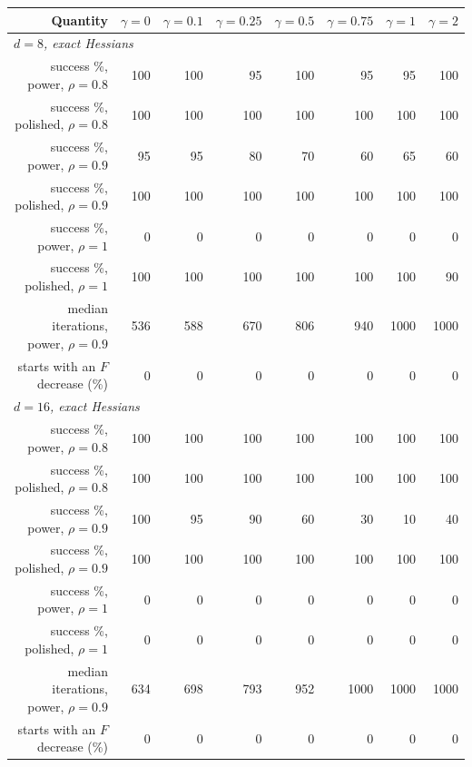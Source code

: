 \begin{tabular}{r rrrrrrr}
\toprule
Quantity & $\gamma=0$ & $\gamma=0.1$ & $\gamma=0.25$ & $\gamma=0.5$ & $\gamma=0.75$ & $\gamma=1$ & $\gamma=2$\\
\midrule
\multicolumn{8}{l}{\emph{$d=8$, exact Hessians}}\\
success \%, power, $\rho=0.8$ & 100 & 100 & 95 & 100 & 95 & 95 & 100 \\
success \%, polished, $\rho=0.8$ & 100 & 100 & 100 & 100 & 100 & 100 & 100 \\
success \%, power, $\rho=0.9$ & 95 & 95 & 80 & 70 & 60 & 65 & 60 \\
success \%, polished, $\rho=0.9$ & 100 & 100 & 100 & 100 & 100 & 100 & 100 \\
success \%, power, $\rho=1$ & 0 & 0 & 0 & 0 & 0 & 0 & 0 \\
success \%, polished, $\rho=1$ & 100 & 100 & 100 & 100 & 100 & 100 & 90 \\
median iterations, power, $\rho=0.9$ & 536 & 588 & 670 & 806 & 940 & 1000 & 1000 \\
starts with an $F$ decrease (\%) & 0 & 0 & 0 & 0 & 0 & 0 & 0 \\
\multicolumn{8}{l}{\emph{$d=16$, exact Hessians}}\\
success \%, power, $\rho=0.8$ & 100 & 100 & 100 & 100 & 100 & 100 & 100 \\
success \%, polished, $\rho=0.8$ & 100 & 100 & 100 & 100 & 100 & 100 & 100 \\
success \%, power, $\rho=0.9$ & 100 & 95 & 90 & 60 & 30 & 10 & 40 \\
success \%, polished, $\rho=0.9$ & 100 & 100 & 100 & 100 & 100 & 100 & 100 \\
success \%, power, $\rho=1$ & 0 & 0 & 0 & 0 & 0 & 0 & 0 \\
success \%, polished, $\rho=1$ & 0 & 0 & 0 & 0 & 0 & 0 & 0 \\
median iterations, power, $\rho=0.9$ & 634 & 698 & 793 & 952 & 1000 & 1000 & 1000 \\
starts with an $F$ decrease (\%) & 0 & 0 & 0 & 0 & 0 & 0 & 0 \\
\bottomrule
\end{tabular}
